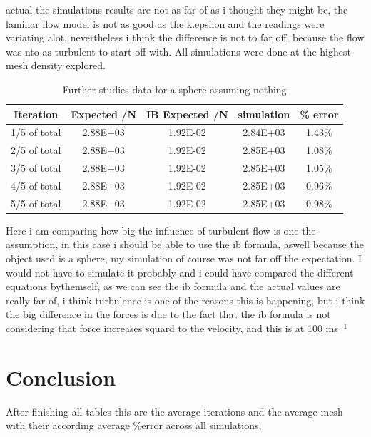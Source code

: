 \documentclass[12pt,a4paper]{article}
\begin{document}
actual the simulations results are not as far of as i thought they might be, the laminar flow model is not as good as the k.epsilon and the readings were variating alot, nevertheless i think the difference is not to far off, because the flow was nto as turbulent to start off with. All simulations were done at the highest mesh density explored.

\begin{table}[H]
\centering
\caption{Further studies data for a sphere assuming nothing}
\label{tab:sphere_ib}
\begin{tabular}{|c|c|c|c|c|}
\hline
\textbf{Iteration} & \textbf{Expected /N} & \textbf{IB Expected /N} & \textbf{simulation} & \textbf{\% error} \\
\hline
1/5 of total & 2.88E+03 & 1.92E-02 & 2.84E+03 & 1.43\% \\
\hline
2/5 of total & 2.88E+03 & 1.92E-02 & 2.85E+03 & 1.08\% \\
\hline
3/5 of total & 2.88E+03 & 1.92E-02 & 2.85E+03 & 1.05\% \\
\hline
4/5 of total & 2.88E+03 & 1.92E-02 & 2.85E+03 & 0.96\% \\
\hline
5/5 of total & 2.88E+03 & 1.92E-02 & 2.85E+03 & 0.98\% \\
\hline
\end{tabular}
\end{table}

Here i am comparing how big the influence of turbulent flow is one the assumption, in this case i should be able to use the ib formula, aswell because the object used is a sphere, my simulation of course was not far off the expectation. I would not have to simulate it probably and i could have compared the different equations bythemself, as we can see the ib formula and the actual values are really far of, i think turbulence is one of the reasons this is happening, but i think the big difference in the forces is due to the fact that the ib formula is not considering that force increases squard to the velocity, and this is at 100 ms$^{-1}$

\section{Conclusion}

After finishing all tables this are the average iterations and the average mesh with their according average \%error across all simulations,
\end{document}
